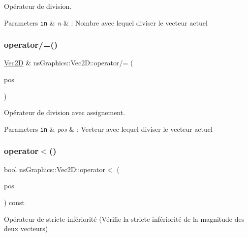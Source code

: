 Opérateur de division. 


\begin{DoxyParams}[1]{Parameters}
\mbox{\tt in}  & {\em n} & \+: Nombre avec lequel diviser le vecteur actuel \\
\hline
\end{DoxyParams}
\mbox{\label{classns_graphics_1_1_vec2_d_a1146ac9d05c667bb4a46140858953711}} 
\subsubsection{\texorpdfstring{operator/=()}{operator/=()}}
{\footnotesize\ttfamily \hyperlink{classns_graphics_1_1_vec2_d}{Vec2D} \& ns\+Graphics\+::\+Vec2\+D\+::operator/= (\begin{DoxyParamCaption}\item[{const \hyperlink{classns_graphics_1_1_vec2_d}{Vec2D} \&}]{pos }\end{DoxyParamCaption})}



Opérateur de division avec assignement. 


\begin{DoxyParams}[1]{Parameters}
\mbox{\tt in}  & {\em pos} & \+: Vecteur avec lequel diviser le vecteur actuel \\
\hline
\end{DoxyParams}
\mbox{\label{classns_graphics_1_1_vec2_d_accfe96cfa5b8495a0b14c7087068064e}} 
\subsubsection{\texorpdfstring{operator$<$()}{operator<()}}
{\footnotesize\ttfamily bool ns\+Graphics\+::\+Vec2\+D\+::operator$<$ (\begin{DoxyParamCaption}\item[{const \hyperlink{classns_graphics_1_1_vec2_d}{Vec2D} \&}]{pos }\end{DoxyParamCaption}) const}



Opérateur de stricte infériorité (Vérifie la stricte infériorité de la magnitude des deux vecteurs) 


